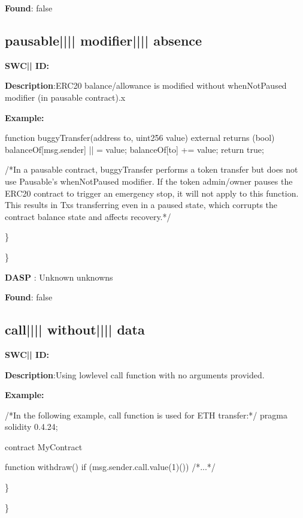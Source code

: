 \documentclass{article}
\begin{document}
\textbf{Found}: false

\subsection{pausable{||\textunderscore|| }modifier{||\textunderscore|| }absence} 
\textbf{SWC{|\textunderscore| }ID:} 

\textbf{Description}:ERC20 balance/allowance is modified without whenNotPaused modifier (in pausable contract).x


\textbf{Example:} 
\begin{ffcode} 

function buggyTransfer(address to, uint256 value) external returns (bool){
        balanceOf[msg.sender] |\textendash| = value;
        balanceOf[to] += value;
        return true;
    }

 /*In a pausable contract, buggyTransfer performs a token transfer but does not use Pausable's whenNotPaused modifier. If the token admin/owner pauses the ERC20 contract to trigger an emergency stop, it will not apply to this function. This results in Txs transferring even in a paused state, which corrupts the contract balance state and affects recovery.*/ 

\end{ffcode} 
\} 

\} 

\textbf{DASP} : Unknown unknowns

\textbf{Found}: false

\subsection{call{||\textunderscore|| }without{||\textunderscore|| }data} 
\textbf{SWC{|\textunderscore| }ID:} 

\textbf{Description}:Using low{\textendash}level call function with no arguments provided.


\textbf{Example:} 
\begin{ffcode} 

 /*In the following example, call function is used for ETH transfer:*/ 
pragma solidity 0.4.24;

contract MyContract {

    function withdraw() {
        if (msg.sender.call.value(1)()) {
        /*...*/
        }
    }
}

\end{ffcode} 
\} 

\} 
\end{document}

